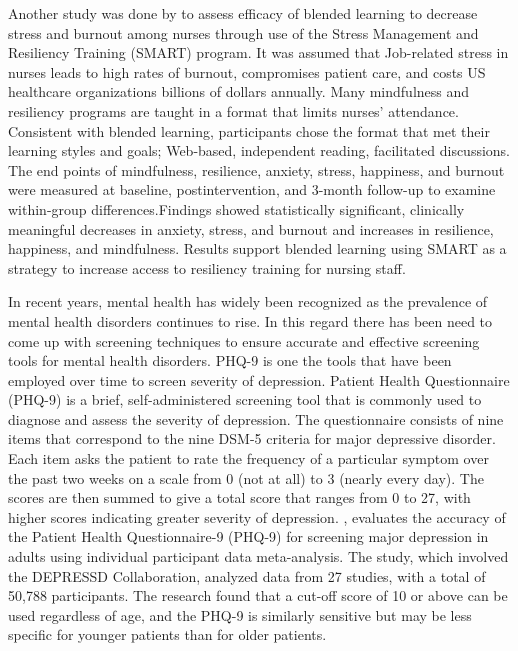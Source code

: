 \documentclass{beamer}
\begin{document}
\begin{frame}
	Another study was done by \cite{magtibay2017decreasing} to assess efficacy of blended learning to decrease stress and burnout among nurses through use of the Stress Management and Resiliency Training (SMART) program. It was assumed that Job-related stress in nurses leads to high rates of burnout, compromises patient care, and costs US healthcare organizations billions of dollars annually. Many mindfulness and resiliency programs are taught in a format that limits nurses’ attendance. Consistent with blended learning, participants chose the format that met their learning styles and goals; Web-based, independent reading, facilitated discussions. The end points of mindfulness, resilience, anxiety, stress, happiness, and burnout were measured at baseline, postintervention, and 3-month follow-up to examine within-group differences.Findings showed statistically significant, clinically meaningful decreases in anxiety, stress, and burnout and increases in resilience, happiness, and mindfulness. Results support blended learning using SMART as a strategy to increase access to resiliency training for nursing staff.
\end{frame}
\begin{frame}
	 In recent years, mental health has widely been recognized as the prevalence of mental health disorders continues to rise. In this regard there has been need to come up with screening techniques to ensure accurate and effective screening tools for mental health disorders. PHQ-9 is one the tools that have been employed over time to screen severity of depression. Patient Health Questionnaire (PHQ-9) is a brief, self-administered screening tool that is commonly used to diagnose and assess the severity of depression. The questionnaire consists of nine items that correspond to the nine DSM-5 criteria for major depressive disorder. Each item asks the patient to rate the frequency of a particular symptom over the past two weeks on a scale from 0 (not at all) to 3 (nearly every day). The scores are then summed to give a total score that ranges from 0 to 27, with higher scores indicating greater severity of depression. \cite{levis2019accuracy}, evaluates the accuracy of the Patient Health Questionnaire-9 (PHQ-9) for screening major depression in adults using individual participant data meta-analysis. The study, which involved the DEPRESSD Collaboration, analyzed data from 27 studies, with a total of 50,788 participants. The research found that a cut-off score of 10 or above can be used regardless of age, and the PHQ-9 is similarly sensitive but may be less specific for younger patients than for older patients.
\end{frame}
\end{document}
